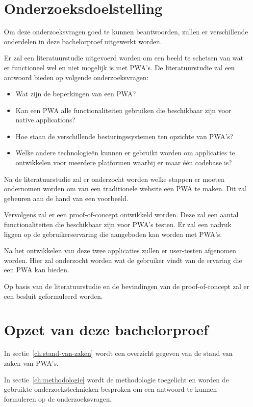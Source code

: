 \section{Onderzoeksdoelstelling}
	
	Om deze onderzoeksvragen goed te kunnen beantwoorden, zullen er verschillende onderdelen in deze bachelorproef uitgewerkt worden.
	
	Er zal een literatuurstudie uitgevoerd worden om een beeld te schetsen van wat er functioneel wel en niet mogelijk is met PWA's. 
	De literatuurstudie zal een antwoord bieden op volgende onderzoeksvragen:
	\begin{itemize}
		  \item Wat zijn de beperkingen van een PWA?
		  \item Kan een PWA alle functionaliteiten gebruiken die beschikbaar zijn voor native applications?
		  \item Hoe staan de verschillende besturingssystemen ten opzichte van PWA's?
		  \item Welke andere technologieën kunnen er gebruikt worden om applicaties te ontwikkelen voor meerdere platformen waarbij er maar één codebase is?
	  \end{itemize}	
	  
	Na de literatuurstudie zal er onderzocht worden welke stappen er moeten ondernomen worden om van een traditionele website een PWA te maken. Dit zal gebeuren aan de hand van een voorbeeld.
	
	Vervolgens zal er een proof-of-concept ontwikkeld worden. Deze zal een aantal functionaliteiten die beschikbaar zijn voor PWA's testen. Er zal een nadruk liggen op de gebruikerservaring die aangeboden kan worden met PWA's. 
	
	Na het ontwikkelen van deze twee applicaties zullen er user-testen afgenomen worden. Hier zal onderzocht worden wat de gebruiker vindt van de ervaring die een PWA kan bieden.
	
	Op basis van de literatuurstudie en de bevindingen van de proof-of-concept zal er een besluit geformuleerd worden.
	
\section{Opzet van deze bachelorproef}

	In sectie~\ref{ch:stand-van-zaken} wordt een overzicht gegeven van de stand van zaken van PWA's.
	
	In sectie~\ref{ch:methodologie} wordt de methodologie toegelicht en worden de gebruikte onderzoekstechnieken besproken om een antwoord te kunnen formuleren op de onderzoeksvragen.
	
